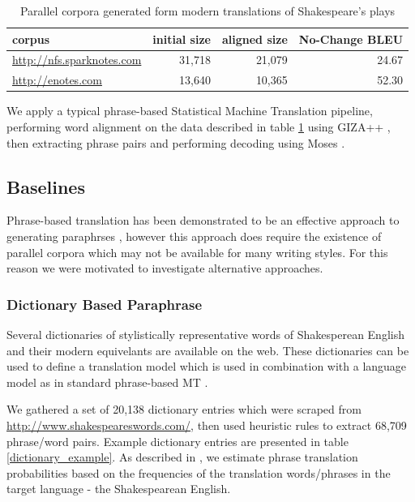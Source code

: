 \documentclass[10pt,a5paper,twoside]{article}
\begin{document}
\begin{table}
  \begin{center}
    \begin{tabular}{|l|r|r|r|}
      \hline
      corpus & initial size & aligned size & No-Change BLEU\\
      \hline
      \hline
      \url{http://nfs.sparknotes.com} & 31,718 & 21,079 & 24.67 \\
      \hline
      \url{http://enotes.com} & 13,640 & 10,365 & 52.30 \\
      \hline
    \end{tabular}
  \end{center}
  \caption{Parallel corpora generated form modern translations of Shakespeare's plays}
  \label{corpus_stats}
\end{table}

We apply a typical phrase-based Statistical Machine Translation pipeline, performing
word alignment on the data described in table \ref{corpus_stats} using GIZA++ \cite{Och03}, then extracting phrase pairs and performing decoding using Moses \cite{Koehn07}.

\subsection{Baselines}
Phrase-based translation has been demonstrated to be an effective approach to generating paraphrses \cite{chen11,quirk04}, however this approach does require the existence of
parallel corpora which may not be available for many writing styles.  For this reason we were motivated to investigate alternative approaches.

\subsubsection{Dictionary Based Paraphrase}
\label{dictionary_baseline}
Several dictionaries of stylistically representative words of Shakesperean English and their modern equivelants are available on the web.  These dictionaries can be used 
to define a translation model which is used in combination with a language model as in standard phrase-based MT \cite{Koehn00}.

We gathered a set of 20,138 dictionary entries which were scraped from \url{http://www.shakespeareswords.com/}, then used heuristic rules to extract 68,709 phrase/word pairs.  Example
dictionary entries are presented in table \ref{dictionary_example}. As described in \cite{Koehn00}, we estimate phrase translation probabilities based on the frequencies of the translation words/phrases in the target language - the Shakespearean English. 
\end{document}
